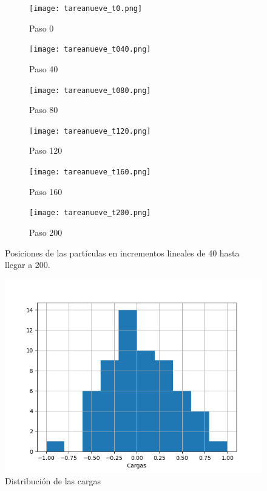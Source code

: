\documentclass{article}
\begin{document}
\begin{figure}
       \centering
       \begin{subfigure}[b]{0.49\linewidth}
           \texttt{[image: tareanueve\_t0.png]}
           \caption{Paso 0}
           \label{fig:westminster_lateral}
        \end{subfigure}
        \begin{subfigure}[b]{0.49\linewidth}
            \texttt{[image: tareanueve\_t040.png]}
            \caption{Paso 40}
            \label{fig:westminster_aerea}
        \end{subfigure}
        \begin{subfigure}[b]{0.49\linewidth}
            \texttt{[image: tareanueve\_t080.png]}
            \caption{Paso 80}
            \label{fig:westminster_aerea}
        \end{subfigure}
        \begin{subfigure}[b]{0.49\linewidth}
            \texttt{[image: tareanueve\_t120.png]}
            \caption{Paso 120}
            \label{fig:westminster_aerea}
        \end{subfigure}
        \begin{subfigure}[b]{0.49\linewidth}
            \texttt{[image: tareanueve\_t160.png]}
            \caption{Paso 160}
            \label{fig:westminster_aerea}
        \end{subfigure}
        \begin{subfigure}[b]{0.49\linewidth}
            \texttt{[image: tareanueve\_t200.png]}
            \caption{Paso 200}
            \label{fig:westminster_aerea}
        \end{subfigure}
        \caption{Posiciones de las part\'iculas en incrementos lineales de 40 hasta llegar a 200.}
        \label{fig:westminster}
\end{figure}

\begin{figure}
  \centering
  \includegraphics[scale=0.85]{tareanuevecargas.png}
  \caption{Distribuci\'on de las cargas}
  \label{fig2}
\end{figure}
\end{document}
